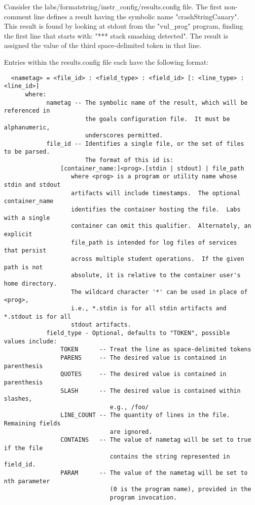 \documentclass[12pt]{article}
\begin{document}
Consider the labs/formatstring/instr\_config/results.config file.  The first non-comment line
defines a result having the symbolic name "crashStringCanary".  This result is
found by looking at stdout from the "vul\_prog" program, finding the first line that starts with:
"*** stack smashing detected".  The result is assigned the value of the third space-delimited 
token in that line.

Entries within the results.config file each have the following format:

\begin{verbatim}
  <nametag> = <file_id> : <field_type> : <field_id> [: <line_type> : <line_id>]
      where:
            nametag -- The symbolic name of the result, which will be referenced in 
                       the goals configuration file.  It must be alphanumeric, 
                       underscores permitted.
            file_id -- Identifies a single file, or the set of files to be parsed.  
                       The format of this id is:
                [container_name:]<prog>.[stdin | stdout] | file_path
                   where <prog> is a program or utility name whose stdin and stdout 
                   artifacts will include timestamps.  The optional container_name 
                   identifies the container hosting the file.  Labs with a single 
                   container can omit this qualifier.  Alternately, an explicit 
                   file_path is intended for log files of services that persist 
                   across multiple student operations.  If the given path is not 
                   absolute, it is relative to the container user's home directory. 
                   The wildcard character '*' can be used in place of <prog>,
                   i.e., *.stdin is for all stdin artifacts and *.stdout is for all 
                   stdout artifacts.
            field_type - Optional, defaults to "TOKEN", possible values include:
                TOKEN      -- Treat the line as space-delimited tokens
                PARENS     -- The desired value is contained in parenthesis
                QUOTES     -- The desired value is contained in parenthesis
                SLASH      -- The desired value is contained within slashes, 
                              e.g., /foo/
                LINE_COUNT -- The quantity of lines in the file. Remaining fields 
                              are ignored.
                CONTAINS   -- The value of nametag will be set to true if the file 
                              contains the string represented in field_id.
                PARAM      -- The value of the nametag will be set to nth parameter
                              (0 is the program name), provided in the 
                              program invocation.  
                              

\end{verbatim}
\end{document}
